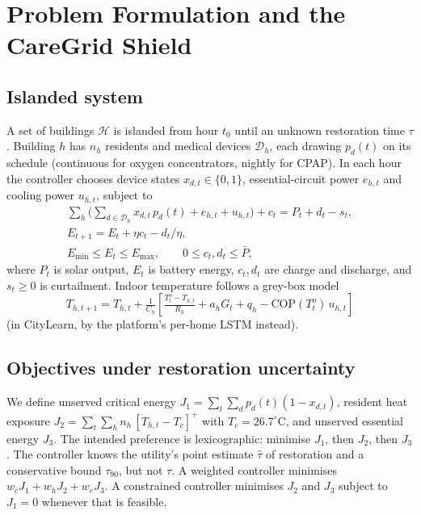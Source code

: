 \documentclass[conference]{IEEEtran}
\begin{document}
\section{Problem Formulation and the CareGrid Shield}
\subsection{Islanded system}
A set of buildings $\mathcal{H}$ is islanded from hour $t_0$ until an unknown restoration time $\tau$. Building $h$ has $n_h$ residents and medical devices $\mathcal{D}_h$, each drawing $p_d(t)$ on its schedule (continuous for oxygen concentrators, nightly for CPAP). In each hour the controller chooses device states $x_{d,t}\in\{0,1\}$, essential-circuit power $e_{h,t}$ and cooling power $u_{h,t}$, subject to
\begin{gather}
\textstyle\sum_{h}\big(\sum_{d\in\mathcal{D}_h} x_{d,t}\,p_d(t) + e_{h,t} + u_{h,t}\big) + c_t = P_t + d_t - s_t, \\
E_{t+1} = E_t + \eta c_t - d_t/\eta, \\
E_{\min}\le E_t\le E_{\max},\qquad 0\le c_t,d_t\le \bar P,
\end{gather}
where $P_t$ is solar output, $E_t$ is battery energy, $c_t,d_t$ are charge and discharge, and $s_t\ge 0$ is curtailment. Indoor temperature follows a grey-box model
\begin{equation}
T_{h,t+1} = T_{h,t} + \tfrac{1}{C_h}\!\left[\tfrac{T^{o}_t - T_{h,t}}{R_h} + a_h G_t + q_h - \mathrm{COP}(T^{o}_t)\,u_{h,t}\right]
\end{equation}
(in CityLearn, by the platform's per-home LSTM instead).

\subsection{Objectives under restoration uncertainty}
We define unserved critical energy $J_1=\sum_t\sum_d p_d(t)(1-x_{d,t})$, resident heat exposure $J_2=\sum_t\sum_h n_h\,[T_{h,t}-T_c]^+$ with $T_c=26.7^\circ$C, and unserved essential energy $J_3$. The intended preference is lexicographic: minimise $J_1$, then $J_2$, then $J_3$. The controller knows the utility's point estimate $\hat\tau$ of restoration and a conservative bound $\tau_{90}$, but not $\tau$. A weighted controller minimises $w_c J_1 + w_h J_2 + w_e J_3$. A constrained controller minimises $J_2$ and $J_3$ subject to $J_1=0$ whenever that is feasible.
\end{document}
